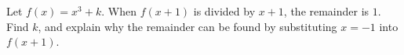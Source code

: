 Let $f(x)=x^3+k$. When $f(x+1)$ is divided by $x+1$, the remainder is $1$. Find $k$, and explain why the remainder can be found by substituting $x=-1$ into $f(x+1)$.
